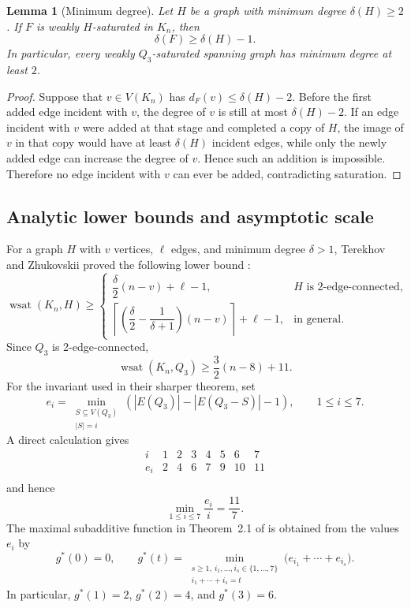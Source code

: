 \documentclass[11pt]{article}
\numberwithin{equation}{section}
\newtheorem{lemma}[theorem]{Lemma}
\newcommand{\wsat}{\operatorname{wsat}}
\begin{document}
\begin{lemma}[Minimum degree]\label{lem:mindeg}
Let $H$ be a graph with minimum degree $\delta(H)\ge2$. If $F$ is weakly $H$-saturated in $K_n$, then
\[
\delta(F)\ge \delta(H)-1.
\]
In particular, every weakly $Q_3$-saturated spanning graph has minimum degree at least $2$.
\end{lemma}

\begin{proof}
Suppose that $v\in V(K_n)$ has $d_F(v)\le \delta(H)-2$. Before the first added edge incident with $v$, the degree of $v$ is still at most $\delta(H)-2$. If an edge incident with $v$ were added at that stage and completed a copy of $H$, the image of $v$ in that copy would have at least $\delta(H)$ incident edges, while only the newly added edge can increase the degree of $v$. Hence such an addition is impossible. Therefore no edge incident with $v$ can ever be added, contradicting saturation.
\end{proof}

\subsection{Analytic lower bounds and asymptotic scale}
For a graph $H$ with $v$ vertices, $\ell$ edges, and minimum degree $\delta>1$, Terekhov and Zhukovskii proved the following lower bound \cite{TZ2025}:
\[
\wsat(K_n,H)\ge
\begin{cases}
\dfrac{\delta}{2}(n-v)+\ell-1,& H\text{ is 2-edge-connected},\\
\left\lceil\left(\dfrac{\delta}{2}-\dfrac{1}{\delta+1}\right)(n-v)\right\rceil+\ell-1,&\text{in general.}
\end{cases}
\tag{2.1}
\]
Since $Q_3$ is 2-edge-connected,
\[
\wsat(K_n,Q_3)\ge \frac32(n-8)+11.
\tag{2.2}
\]
For the invariant used in their sharper theorem, set
\[
e_i=\min_{\substack{S\subseteq V(Q_3)\\|S|=i}}
\left(|E(Q_3)|-|E(Q_3-S)|-1\right),
\qquad 1\le i\le7.
\tag{2.3}
\]
A direct calculation gives
\[
\begin{array}{c|ccccccc}
i&1&2&3&4&5&6&7\\ \hline
e_i&2&4&6&7&9&10&11\\
\end{array}
\tag{2.4}
\]
and hence
\[
\min_{1\le i\le7}\frac{e_i}{i}=\frac{11}{7}.
\tag{2.5}
\]
The maximal subadditive function in Theorem~2.1 of \cite{TZ2025} is obtained from the values $e_i$ by
\[
g^*(0)=0,\qquad
g^*(t)=\min_{\substack{s\ge1,\ i_1,\ldots,i_s\in\{1,\ldots,7\}\\ i_1+\cdots+i_s=t}}
\bigl(e_{i_1}+\cdots+e_{i_s}\bigr).
\tag{2.6}
\]
In particular, $g^*(1)=2$, $g^*(2)=4$, and $g^*(3)=6$.
\end{document}
